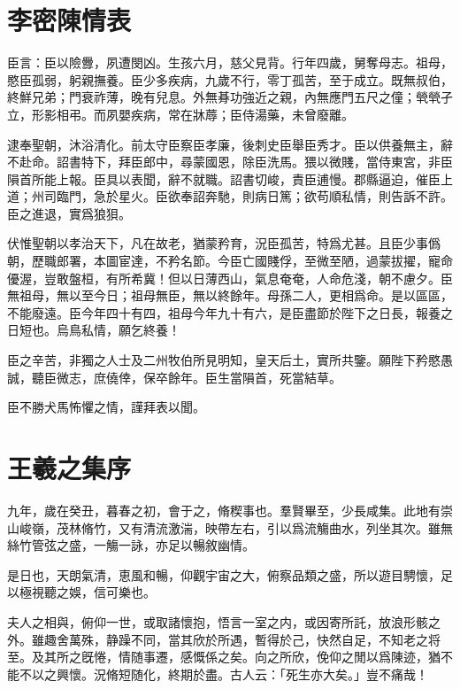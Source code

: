 \section[陳情表\quad{\small 李密}]{{\normalsize 李密}\quad 陳情表}
臣言：臣以險釁，夙遭閔凶。生孩六月，慈父見背。行年四歲，舅奪母志。祖母，愍臣孤弱，躬親撫養。臣少多疾病，九歲不行，零丁孤苦，至于成立。既無叔伯，終鮮兄弟；門衰祚薄，晚有兒息。外無朞功強近之親，內無應門五尺之僮；煢煢孑立，形影相弔。而夙嬰疾病，常在牀蓐；臣侍湯藥，未曾廢離。

逮奉聖朝，沐浴清化。前太守臣察臣孝廉，後刺史臣舉臣秀才。臣以供養無主，辭不赴命。詔書特下，拜臣郎中，尋蒙國恩，除臣洗馬。猥以微賤，當侍東宮，非臣隕首所能上報。臣具以表聞，辭不就職。詔書切峻，責臣逋慢。郡縣逼迫，催臣上道；州司臨門，急於星火。臣欲奉詔奔馳，則病日篤；欲苟順私情，則告訴不許。臣之進退，實爲狼狽。

伏惟聖朝以孝治天下，凡在故老，猶蒙矜育，況臣孤苦，特爲尤甚。且臣少事僞朝，歷職郎署，本圖宦達，不矜名節。今臣亡國賤俘，至微至陋，過蒙拔擢，寵命優渥，豈敢盤桓，有所希冀！但以日薄西山，氣息奄奄，人命危淺，朝不慮夕。臣無祖母，無以至今日；祖母無臣，無以終餘年。母孫二人，更相爲命。是以區區，不能廢遠。臣今年四十有四，祖母今年九十有六，是臣盡節於陛下之日長，報養之日短也。烏鳥私情，願乞終養！

臣之辛苦，非獨之人士及二州牧伯所見明知，皇天后土，實所共鑒。願陛下矜愍愚誠，聽臣微志，庶僥倖，保卒餘年。臣生當隕首，死當結草。

臣不勝犬馬怖懼之情，謹拜表以聞。 

\theendnotes

\section[蘭亭集序\quad{\small 王羲之}]{{\normalsize 王羲之}\quad {}集序}
九年，歲在癸丑，暮春之初，會于之，脩稧事也。羣賢畢至，少長咸集。此地有崇山峻嶺，茂林脩竹，又有清流激湍，映帶左右，引以爲流觴曲水，列坐其次。雖無絲竹管弦之盛，一觴一詠，亦足以暢敘幽情。

是日也，天朗氣清，恵風和暢，仰觀宇宙之大，俯察品類之盛，所以遊目騁懷，足以極視聽之娛，信可樂也。

夫人之相與，俯仰一世，或取諸懷抱，悟言一室之内，或因寄所託，放浪形骸之外。雖趣舍萬殊，静躁不同，當其欣於所遇，暫得於己，快然自足，不知老之将至。及其所之旣惓，情随事遷，感慨係之矣。向之所欣，俛仰之閒以爲陳迹，猶不能不以之興懷。況脩短随化，終期於盡。古人云：「死生亦大矣。」豈不痛哉！

